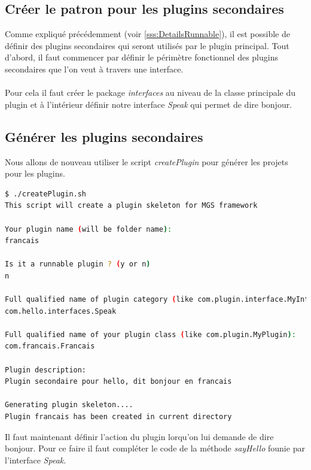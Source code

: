 \documentclass[12pt,a4paper]{article}
\begin{document}
\subsection{Créer le patron pour les plugins secondaires}
Comme expliqué précédemment (voir \ref{sss:DetailsRunnable}), il est possible de 
définir des plugins secondaires qui seront utilisés par le plugin principal. 
Tout d'abord, il faut commencer par définir le périmètre fonctionnel des 
plugins secondaires que l'on veut à travers une interface.
\\\\
Pour cela il faut créer le package \emph{interfaces} au niveau de la classe 
principale du plugin et à l'intérieur définir notre interface \emph{Speak} qui 
permet de dire bonjour.

\lstset{language=java,caption=/plugins/hello/src/main/java/com/hello/interfaces/Speak.java}


\subsection{Générer les plugins secondaires}
Nous allons de nouveau utiliser le script \emph{createPlugin} pour générer les 
projets pour les plugins.

\begin{lstlisting}[language=bash,caption=Création du plugin francais]
$ ./createPlugin.sh 
This script will create a plugin skeleton for MGS framework

Your plugin name (will be folder name):
francais

Is it a runnable plugin ? (y or n)
n

Full qualified name of plugin category (like com.plugin.interface.MyInterface):
com.hello.interfaces.Speak

Full qualified name of your plugin class (like com.plugin.MyPlugin):
com.francais.Francais

Plugin description:
Plugin secondaire pour hello, dit bonjour en francais

Generating plugin skeleton....
Plugin francais has been created in current directory
\end{lstlisting}

Il faut maintenant définir l'action du plugin lorqu'on lui demande de dire bonjour. 
Pour ce faire il faut compléter le code de la méthode \emph{sayHello} founie par 
l'interface \emph{Speak}.

\lstset{language=java,caption=/plugins/francais/src/main/java/com/francais/Francais.java}

\end{document}
